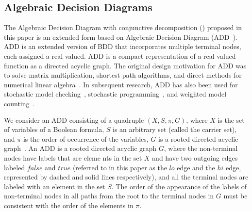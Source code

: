 \subsection{Algebraic Decision Diagrams}
The Algebraic Decision Diagram with conjunctive decomposition (\ADDAND) proposed in this paper is an extended form based on Algebraic Decision Diagram (ADD~\cite{bahar1997algebric}).
ADD is an extended version of BDD that incorporates multiple terminal nodes, each assigned a real-valued. 
ADD is a compact representation of a real-valued function as a directed acyclic graph. 
The original design motivation for ADD was to solve matrix multiplication, shortest path algorithms, and direct methods for numerical linear algebra~\cite{bahar1997algebric}.
In subsequent research, ADD has also been used for stochastic model checking~\cite{kwiatkowska2007stochastic}, stochastic programming~\cite{hoey2013spudd}, and weighted model counting~\cite{dudek2020addmc}.

We consider an ADD consisting of a quadruple $(X,S,\pi,G)$, where $X$ is the set of variables of a Boolean formula, $S$ is an arbitrary set (called the carrier set), and $\pi$ is the order of occurrence of the variables, $G$ is a rooted directed acyclic graph~\cite{dudek2020addmc}.
An ADD is a rooted directed acyclic graph $G$, where the non-terminal nodes have labels that are eleme nts in the set $X$ and have two outgoing edges labeled $false$ and $true$ (referred to in this paper as the $lo$ edge and the $hi$ edge, represented by dashed and solid lines respectively), and all the terminal nodes are labeled with an element in the set $S$.
The order of the appearance of the labels of non-terminal nodes in all paths from the root to the terminal nodes in $G$ must be consistent with the order of the elements in $\pi$.



